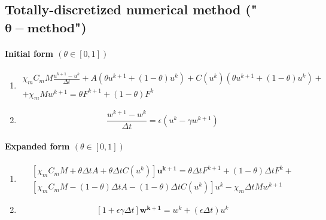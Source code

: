 \documentclass[a4paper]{article}
\begin{document}
\subsection{Totally-discretized numerical method ("$\bm{\theta-method}$")}
\vspace{5mm}
\paragraph{Initial form $(\theta \in [0,1])$}
\begin{enumerate}
	\item
	\begin{equation}
	\begin{gathered}
	\chi_mC_m M \frac{u^{k+1}-u^k}{\Delta t} +  A \left(\theta u^{k+1} + (1-\theta)u^k \right) + C(u^k)\left(\theta u^{k+1} + (1-\theta)u^k \right) +
	\\ +\chi_mMw^{k+1}=\theta F^{k+1} + (1-\theta)F^k
	\end{gathered}
	\end{equation}
	\item
	\begin{equation}
	\frac{w^{k+1}- w^{k}}{\Delta t} = \epsilon(u^k-\gamma w^{k+1})
	\end{equation}
\end{enumerate}
\vspace{3mm}
\paragraph{Expanded form $(\theta \in [0,1])$}
\begin{enumerate}
	\item
	\begin{equation}
	\begin{gathered}
	\left[\chi_mC_mM+\theta \Delta t A + \theta \Delta t C(u^k) \right] \bm{u^{k+1}} = \theta\Delta t F^{k+1} + (1-\theta)\Delta tF^k +
	\\
	\left[\chi_mC_mM- (1-\theta)\Delta t A - (1-\theta)\Delta t C(u^k)\right] u^k -\chi_m\Delta t Mw^{k+1} 
	\end{gathered}
	\end{equation}
	\item
	\begin{equation}
	\left[1+ \epsilon \gamma \Delta t\right] \bm{w^{k+1}} = w^k + (\epsilon \Delta t) u^k
	\end{equation}
\end{enumerate}
\end{document}
